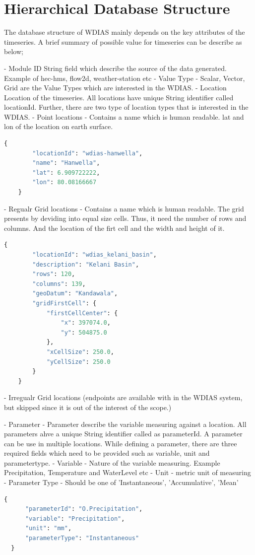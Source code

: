 \section{Hierarchical Database Structure}
 
The database structure of WDIAS mainly depends on the key attributes of the timeseries. A brief summary of possible value for timeseries can be describe as below;

- Module ID
  String field which describe the source of the data generated. Example of hec-hms, flow2d, weather-station etc
- Value Type
  - Scalar, Vector, Grid are the Value Types which are interested in the WDIAS.
- Location
  Location of the timeseries. All locations have unique String identifier called locationId. Further, there are two type of location types that is interested in the WDIAS.
  - Point locations - Contains a name which is human readable. lat and lon of the location on earth surface.
  \begin{lstlisting}[language=Python]
    {
        "locationId": "wdias-hanwella",
        "name": "Hanwella",
        "lat": 6.909722222,
        "lon": 80.08166667
    }
  \end{lstlisting}
  - Regualr Grid locations - Contains a name which is human readable. The grid presents by deviding into equal size cells. Thus, it need the number of rows and columns. 
  And the location of the firt cell and the width and height of it.
  \begin{lstlisting}[language=Python]
      {
        "locationId": "wdias_kelani_basin",
        "description": "Kelani Basin",
        "rows": 120,
        "columns": 139,
        "geoDatum": "Kandawala",
        "gridFirstCell": {
            "firstCellCenter": {
                "x": 397074.0,
                "y": 504875.0
            },
            "xCellSize": 250.0,
            "yCellSize": 250.0
        }
    }
\end{lstlisting}
  - Irregualr Grid locations (endpoints are available with in the WDIAS system, but skipped since it is out of the interest of the scope.)

- Parameter - Parameter describe the variable measuring against a location. All parameters ahve a unique String identifier called as parameterId. A parameter can be use in multiple locations.
While defining a parameter, there are three required fields which need to be provided such as variable, unit and parametertype.
- Variable - Nature of the variable measuring. Example Precipitation, Temperature and WaterLevel etc
- Unit - metric unit of measuring
- Parameter Type - Should be one of 'Instantaneous', 'Accumulative', 'Mean'
  \begin{lstlisting}[language=Python]
  {
      "parameterId": "O.Precipitation",
      "variable": "Precipitation",
      "unit": "mm",
      "parameterType": "Instantaneous"
  }
  \end{lstlisting}

